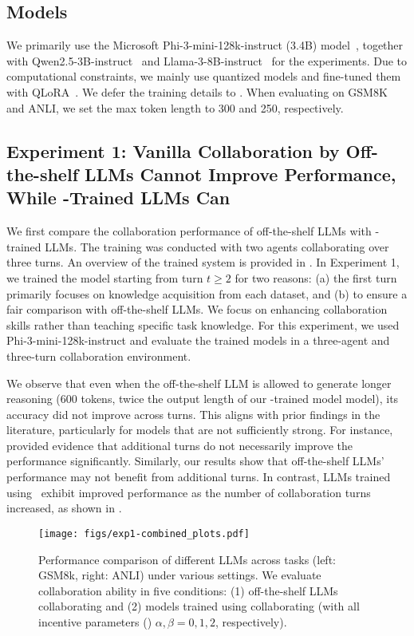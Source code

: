 \subsection{Models}
We primarily use the Microsoft Phi-3-mini-128k-instruct (3.4B) model~\citep{abdin2024phi}, together with Qwen2.5-3B-instruct~\citep{yang2024qwen2} and Llama-3-8B-instruct~\citep{dubey2024llama} for  the experiments. Due to computational constraints, we mainly use quantized models and fine-tuned them with QLoRA~\citep{dettmers2024qlora}. We defer the training details to . When evaluating on GSM8K and ANLI, we set the max token length to 300 and 250, respectively.



\subsection{Experiment 1: Vanilla Collaboration by Off-the-shelf LLMs Cannot Improve Performance, While \ours-Trained LLMs Can}
\label{sec-exp1}
We first compare the collaboration performance of off-the-shelf LLMs with \ours-trained LLMs. The training was conducted with two agents collaborating over three turns. An overview of the trained system is provided in . In Experiment 1, we trained the model starting from turn \( t \geq 2 \) for two reasons: (a) the first turn primarily focuses on knowledge acquisition from each dataset, and (b) to ensure a fair comparison with off-the-shelf LLMs. We focus on enhancing collaboration skills rather than teaching specific task knowledge. For this experiment, we used Phi-3-mini-128k-instruct and evaluate the trained models in a three-agent and three-turn collaboration environment.

We observe that even when the off-the-shelf LLM is allowed to generate longer reasoning (600 tokens, twice the output length of our \ours-trained model  model), its accuracy did not improve across turns. 
This aligns with prior findings in the literature, particularly for models that are not sufficiently strong. For instance, \citet[Table 7]{huang2023large} provided  evidence that additional turns do not necessarily improve the  performance significantly. 
Similarly, our results show that off-the-shelf LLMs' performance may not benefit from additional turns. In contrast, LLMs trained using \ours~exhibit improved performance as the number of collaboration turns increased, as shown in .

\begin{figure}[!h]
       \centering
        \texttt{[image: figs/exp1-combined\_plots.pdf]}
    \safevspace{-4mm}
    \caption{Performance comparison of different LLMs across tasks (left: GSM8k, right: ANLI) under various settings. We evaluate collaboration ability in five conditions: (1) off-the-shelf LLMs collaborating and (2) models trained using \oursspace collaborating (with all incentive parameters () $\alpha, \beta = 0,1, 2$, respectively).}
    \label{fig:turn-performance-gsm9k-anli}
\end{figure}
\safevspace{-5mm}

